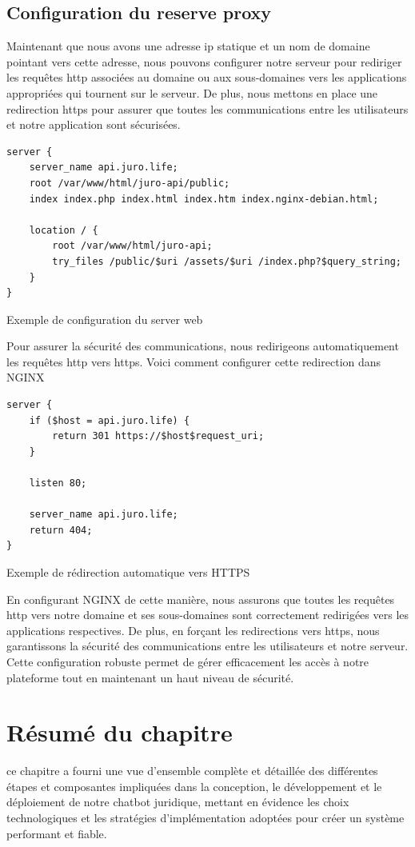 \subsection{Configuration du reserve proxy}

Maintenant que nous avons une adresse \ac{ip} statique et un nom de domaine pointant vers cette adresse, nous pouvons configurer notre serveur pour rediriger les requêtes \ac{http} associées au domaine ou aux sous-domaines vers les applications appropriées qui tournent sur le serveur. De plus, nous mettons en place une redirection \ac{https} pour assurer que toutes les communications entre les utilisateurs et notre application sont sécurisées.

\begin{listing}[!ht]
\begin{verbatim}
server {
    server_name api.juro.life;
    root /var/www/html/juro-api/public;
    index index.php index.html index.htm index.nginx-debian.html;

    location / {
        root /var/www/html/juro-api;
        try_files /public/$uri /assets/$uri /index.php?$query_string;
    }
}
\end{verbatim}
\caption{Exemple de configuration du server web}
\label{appendix:code:conf:web-nginx}
\end{listing}

Pour assurer la sécurité des communications, nous redirigeons automatiquement les requêtes \ac{http} vers \ac{https}. Voici comment configurer cette redirection dans NGINX

\begin{listing}[!ht]
\begin{verbatim}
server {
    if ($host = api.juro.life) {
        return 301 https://$host$request_uri;
    }

    listen 80;

    server_name api.juro.life;
    return 404;
}
\end{verbatim}
\caption{Exemple de rédirection automatique vers HTTPS}
\label{appendix:code:conf:web-http}
\end{listing}

En configurant NGINX de cette manière, nous assurons que toutes les requêtes \ac{http} vers notre domaine et ses sous-domaines sont correctement redirigées vers les applications respectives. De plus, en forçant les redirections vers \ac{https}, nous garantissons la sécurité des communications entre les utilisateurs et notre serveur. Cette configuration robuste permet de gérer efficacement les accès à notre plateforme tout en maintenant un haut niveau de sécurité.

\section{Résumé du chapitre}
ce chapitre a fourni une vue d'ensemble complète et détaillée des différentes étapes et composantes impliquées dans la conception, le développement et le déploiement de notre chatbot juridique, mettant en évidence les choix technologiques et les stratégies d'implémentation adoptées pour créer un système performant et fiable.
